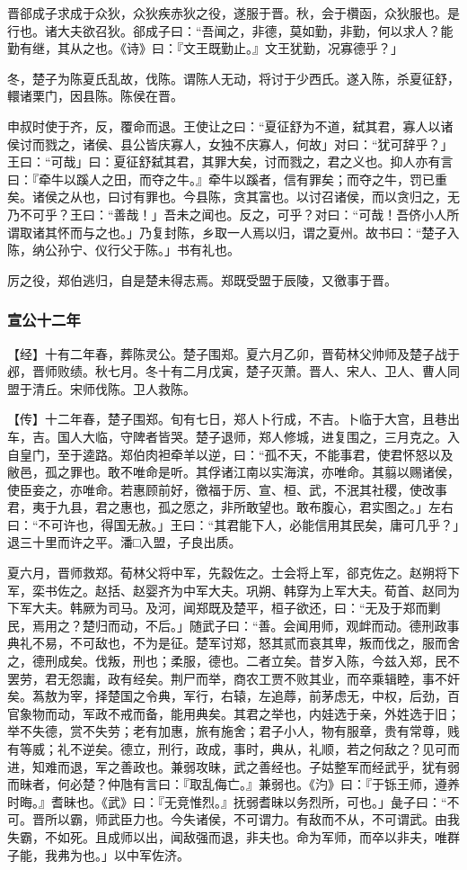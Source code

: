 \documentclass[]{article}
\begin{document}
晋郤成子求成于众狄，众狄疾赤狄之役，遂服于晋。秋，会于欑函，众狄服也。是行也。诸大夫欲召狄。郤成子曰：``吾闻之，非德，莫如勤，非勤，何以求人？能勤有继，其从之也。《诗》曰：『文王既勤止。』文王犹勤，况寡德乎？」

冬，楚子为陈夏氏乱故，伐陈。谓陈人无动，将讨于少西氏。遂入陈，杀夏征舒，轘诸栗门，因县陈。陈侯在晋。

申叔时使于齐，反，覆命而退。王使让之曰：``夏征舒为不道，弑其君，寡人以诸侯讨而戮之，诸侯、县公皆庆寡人，女独不庆寡人，何故」对曰：``犹可辞乎？」王曰：``可哉」曰：夏征舒弑其君，其罪大矣，讨而戮之，君之义也。抑人亦有言曰：『牵牛以蹊人之田，而夺之牛。』牵牛以蹊者，信有罪矣；而夺之牛，罚已重矣。诸侯之从也，曰讨有罪也。今县陈，贪其富也。以讨召诸侯，而以贪归之，无乃不可乎？王曰：``善哉！」吾未之闻也。反之，可乎？对曰：``可哉！吾侪小人所谓取诸其怀而与之也。」乃复封陈，乡取一人焉以归，谓之夏州。故书曰：``楚子入陈，纳公孙宁、仪行父于陈。」书有礼也。

厉之役，郑伯逃归，自是楚未得志焉。郑既受盟于辰陵，又徼事于晋。

\hypertarget{header-n1422}{%
\subsubsection{宣公十二年}\label{header-n1422}}

【经】十有二年春，葬陈灵公。楚子围郑。夏六月乙卯，晋荀林父帅师及楚子战于邲，晋师败绩。秋七月。冬十有二月戊寅，楚子灭萧。晋人、宋人、卫人、曹人同盟于清丘。宋师伐陈。卫人救陈。

【传】十二年春，楚子围郑。旬有七日，郑人卜行成，不吉。卜临于大宫，且巷出车，吉。国人大临，守陴者皆哭。楚子退师，郑人修城，进复围之，三月克之。入自皇门，至于逵路。郑伯肉袒牵羊以逆，曰：``孤不天，不能事君，使君怀怒以及敝邑，孤之罪也。敢不唯命是听。其俘诸江南以实海滨，亦唯命。其翦以赐诸侯，使臣妾之，亦唯命。若惠顾前好，徼福于厉、宣、桓、武，不泯其社稷，使改事君，夷于九县，君之惠也，孤之愿之，非所敢望也。敢布腹心，君实图之。」左右曰：``不可许也，得国无赦。」王曰：``其君能下人，必能信用其民矣，庸可几乎？」退三十里而许之平。潘□入盟，子良出质。

夏六月，晋师救郑。荀林父将中军，先縠佐之。士会将上军，郤克佐之。赵朔将下军，栾书佐之。赵括、赵婴齐为中军大夫。巩朔、韩穿为上军大夫。荀首、赵同为下军大夫。韩厥为司马。及河，闻郑既及楚平，桓子欲还，曰：``无及于郑而剿民，焉用之？楚归而动，不后。」随武子曰：``善。会闻用师，观衅而动。德刑政事典礼不易，不可敌也，不为是征。楚军讨郑，怒其贰而哀其卑，叛而伐之，服而舍之，德刑成矣。伐叛，刑也；柔服，德也。二者立矣。昔岁入陈，今兹入郑，民不罢劳，君无怨讟，政有经矣。荆尸而举，商农工贾不败其业，而卒乘辑睦，事不奸矣。蒍敖为宰，择楚国之令典，军行，右辕，左追蓐，前茅虑无，中权，后劲，百官象物而动，军政不戒而备，能用典矣。其君之举也，内娃选于亲，外姓选于旧；举不失德，赏不失劳；老有加惠，旅有施舍；君子小人，物有服章，贵有常尊，贱有等威；礼不逆矣。德立，刑行，政成，事时，典从，礼顺，若之何敌之？见可而进，知难而退，军之善政也。兼弱攻昧，武之善经也。子姑整军而经武乎，犹有弱而昧者，何必楚？仲虺有言曰：『取乱侮亡。』兼弱也。《汋》曰：『于铄王师，遵养时晦。』耆昧也。《武》曰：『无竞惟烈。』抚弱耆昧以务烈所，可也。」彘子曰：``不可。晋所以霸，师武臣力也。今失诸侯，不可谓力。有敌而不从，不可谓武。由我失霸，不如死。且成师以出，闻敌强而退，非夫也。命为军师，而卒以非夫，唯群子能，我弗为也。」以中军佐济。
\end{document}
